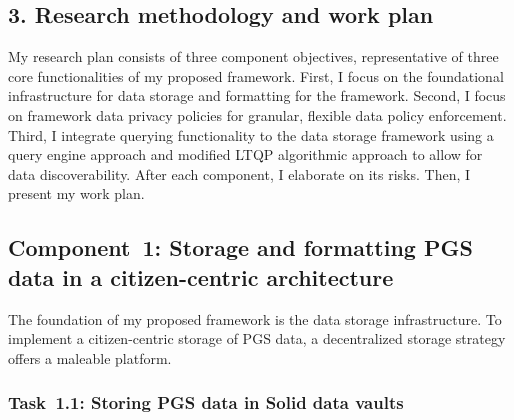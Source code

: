 \documentclass[a4paper,11pt]{article}
\begin{document}
\begin{refsection}
\newpage

\section{3. Research methodology and work plan}

\begin{comment}
\textit{Elaborate the different envisaged steps (experiments/activities) in your research, and motivate strategic choices in view of reaching the objectives. Describe the set-up and cohesion of the work packages including intermediate goals (milestones).
Show where the proposed methodology (research approach) is according to the state of the art and where it is novel. Discuss risks that might endanger reaching project objectives and the contingency plans to be put in place should this risk occur.
Use a table or graphic representation of the planned course of activities (timing work packages, milestones, critical path) over the 4-years grant period.}
\end{comment}

\medskip

\noindent
My research plan consists of three component objectives, representative of three core functionalities of my proposed framework.
%
First, I focus on the foundational infrastructure for data storage and formatting for the framework.
%
Second, I focus on framework data privacy policies for granular, flexible data policy enforcement.
%
Third, I integrate querying functionality to the data storage framework using a query engine approach and modified LTQP algorithmic approach to allow for data discoverability.
%
After each component, I elaborate on its risks.
Then, I present my work plan.

\newcommand\WPa{Storage and formatting PGS data in a citizen-centric architecture}
\subsection{Component~1: \WPa}

The foundation of my proposed framework is the data storage infrastructure.
To implement a citizen-centric storage of PGS data, a decentralized storage strategy offers a maleable platform.

\newcommand\WPaa{Storing PGS data in Solid data vaults}
\subsubsection{Task~1.1: \WPaa}


\end{refsection}
\end{document}
